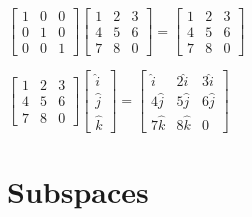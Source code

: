 \documentclass{article}
\begin{document}
{\begin{center}
$ \begin{bmatrix} 1 & 0 & 0 \\ 0 & 1 & 0 \\ 0 & 0 & 1 \end{bmatrix}\begin{bmatrix} 1 & 2 & 3 \\ 4 & 5 & 6 \\ 7 & 8 & 0  \end{bmatrix} = \begin{bmatrix} 1 & 2 & 3 \\ 4 & 5 & 6 \\ 7 & 8 & 0  \end{bmatrix}
$
\end{center}
\begin{center} 
$\begin{bmatrix} 1 & 2 & 3 \\ 4 & 5 & 6 \\ 7 & 8 & 0 \end{bmatrix}\begin{bmatrix} \hat{i} \\ \hat{j} \\ \hat{k} \end{bmatrix} =\begin{bmatrix} \hat{i} & 2\hat{i} & 3\hat{i} \\ 4\hat{j} & 5\hat{j} & 6\hat{j} \\ 7\hat{k} & 8\hat{k} & 0 \end{bmatrix} 
$
\end{center}










\section{Subspaces}
\textbar{}
}
\end{document}
